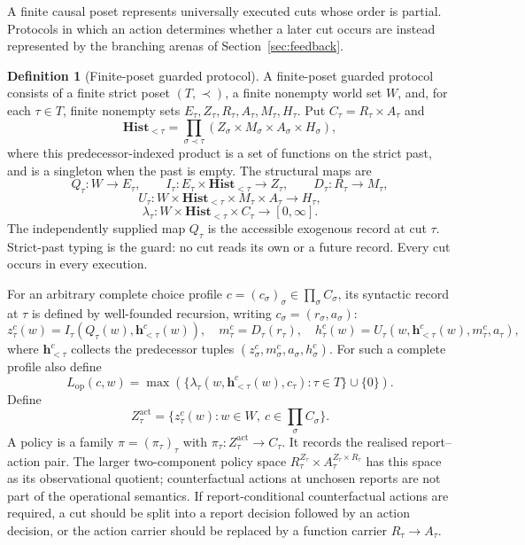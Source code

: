 \documentclass[11pt]{article}
\theoremstyle{plain}
\theoremstyle{definition}
\newtheorem{definition}[theorem]{Definition}
\theoremstyle{remark}
\begin{document}
A finite causal poset represents universally executed cuts whose order is
partial. Protocols in which an action determines whether a later cut occurs are
instead represented by the branching arenas of Section~\ref{sec:feedback}.

\begin{definition}[Finite-poset guarded protocol]
\label{def:operational-feedback}
A finite-poset guarded protocol consists of a finite strict poset
$(T,\prec)$, a finite nonempty world set $W$, and, for each $\tau\in T$,
finite nonempty sets $E_\tau,Z_\tau,R_\tau,A_\tau,M_\tau,H_\tau$. Put
$C_\tau=R_\tau\times A_\tau$ and
\[
\mathbf{Hist}_{<\tau}
=\prod_{\sigma\prec\tau}
(Z_\sigma\times M_\sigma\times A_\sigma\times H_\sigma),
\]
where this predecessor-indexed product is a set of functions on the strict
past, and is a singleton when the past is empty. The structural maps are
\[
Q_\tau:W\to E_\tau,
\qquad
I_\tau:E_\tau\times\mathbf{Hist}_{<\tau}\to Z_\tau,
\qquad
D_\tau:R_\tau\to M_\tau,
\]
\[
U_\tau:W\times\mathbf{Hist}_{<\tau}\times M_\tau\times A_\tau
\to H_\tau,
\]
\[
\lambda_\tau:
W\times\mathbf{Hist}_{<\tau}\times C_\tau\to[0,\infty].
\]
The independently supplied map $Q_\tau$ is the accessible exogenous record at
cut $\tau$. Strict-past typing is the guard: no cut reads its own or a future
record. Every cut occurs in every execution.

For an arbitrary complete choice profile $c=(c_\sigma)_\sigma\in
\prod_\sigma C_\sigma$, its syntactic record at $\tau$ is defined by
well-founded recursion, writing $c_\sigma=(r_\sigma,a_\sigma)$:
\[
z_\tau^c(w)=I_\tau(Q_\tau(w),\mathbf h_{<\tau}^c(w)),
\quad m_\tau^c=D_\tau(r_\tau),
\quad
h_\tau^c(w)=U_\tau(w,\mathbf h_{<\tau}^c(w),m_\tau^c,a_\tau),
\]
where $\mathbf h_{<\tau}^c$ collects the predecessor tuples
$(z_\sigma^c,m_\sigma^c,a_\sigma,h_\sigma^c)$. For such a complete profile also define
\[
L_{\mathrm{op}}(c,w)=
\max\left(
\{\lambda_\tau(w,\mathbf h_{<\tau}^c(w),c_\tau):\tau\in T\}
\cup\{0\}\right).
\]
Define
\[
Z_\tau^{\mathrm{act}}
=\{z_\tau^c(w):w\in W,\ c\in\prod_\sigma C_\sigma\}.
\]
A policy is a family
$\pi=(\pi_\tau)_\tau$ with
$\pi_\tau:Z_\tau^{\mathrm{act}}\to C_\tau$.
It records the realised report--action pair. The larger two-component policy
space $R_\tau^{Z_\tau}\times A_\tau^{Z_\tau\times R_\tau}$ has this space as
its observational quotient; counterfactual actions at unchosen reports are not
part of the operational semantics. If report-conditional counterfactual actions
are required, a cut should be split into a report decision followed by an action
decision, or the action carrier should be replaced by a function carrier
$R_\tau\to A_\tau$.
\end{definition}
\end{document}

